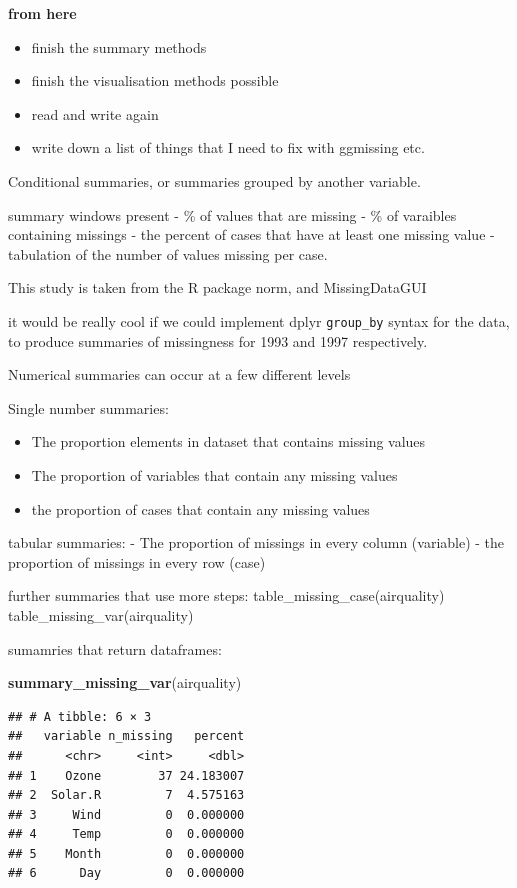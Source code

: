 \documentclass[]{article}
\newenvironment{Shaded}{\begin{snugshade}}{\end{snugshade}}
\newcommand{\KeywordTok}[1]{\textcolor[rgb]{0.13,0.29,0.53}{\textbf{{#1}}}}
\newcommand{\NormalTok}[1]{{#1}}
\providecommand{\tightlist}{%
  \setlength{\itemsep}{0pt}\setlength{\parskip}{0pt}}
\begin{document}
\textbf{from here}

\begin{itemize}
\tightlist
\item
  finish the summary methods
\item
  finish the visualisation methods possible
\item
  read and write again
\item
  write down a list of things that I need to fix with ggmissing etc.
\end{itemize}

Conditional summaries, or summaries grouped by another variable.

summary windows present - \% of values that are missing - \% of
varaibles containing missings - the percent of cases that have at least
one missing value - tabulation of the number of values missing per case.

This study is taken from the R package norm, and MissingDataGUI

it would be really cool if we could implement dplyr \texttt{group\_by}
syntax for the data, to produce summaries of missingness for 1993 and
1997 respectively.

Numerical summaries can occur at a few different levels

Single number summaries:

\begin{itemize}
\tightlist
\item
  The proportion elements in dataset that contains missing values
\item
  The proportion of variables that contain any missing values
\item
  the proportion of cases that contain any missing values
\end{itemize}

tabular summaries: - The proportion of missings in every column
(variable) - the proportion of missings in every row (case)

further summaries that use more steps: table\_missing\_case(airquality)
table\_missing\_var(airquality)

sumamries that return dataframes:

\begin{Shaded}
\begin{Highlighting}[]
\KeywordTok{summary_missing_var}\NormalTok{(airquality)}
\end{Highlighting}
\end{Shaded}

\begin{verbatim}
## # A tibble: 6 × 3
##   variable n_missing   percent
##      <chr>     <int>     <dbl>
## 1    Ozone        37 24.183007
## 2  Solar.R         7  4.575163
## 3     Wind         0  0.000000
## 4     Temp         0  0.000000
## 5    Month         0  0.000000
## 6      Day         0  0.000000
\end{verbatim}
\end{document}
